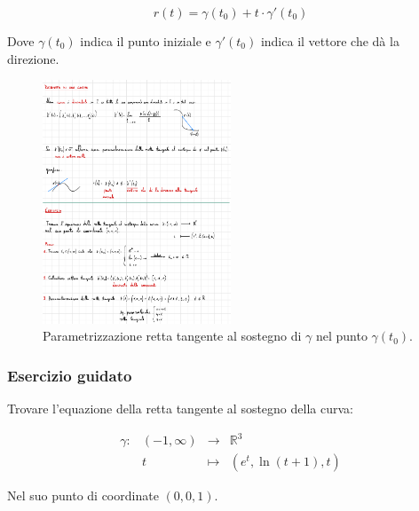 \documentclass[a4paper]{article}
\begin{document}
	\begin{equation*}
		r\left(t\right) = \gamma\left(t_{0}\right) + t \cdot \gamma'\left(t_{0}\right)
	\end{equation*}

	\noindent
	Dove $\gamma\left(t_{0}\right)$ indica il punto iniziale e $\gamma'\left(t_{0}\right)$ indica il vettore che dà la direzione.
	
	\begin{figure}[!htp]
		\centering
		\includegraphics[width=0.5\textwidth]{img/derivata_curva2.pdf}
		\caption{Parametrizzazione retta tangente al sostegno di $\gamma$ nel punto $\gamma\left(t_{0}\right)$.}
	\end{figure}

	\newpage
	
	\subsubsection[Esercizio guidato]{\textcolor{Green4}{Esercizio guidato}}
	
	Trovare l'equazione della retta tangente al sostegno della curva:
	
	\begin{equation*}
		\begin{array}{llll}
			\gamma:	& \left(-1,\infty\right) & \longrightarrow & \mathbb{R}^{3} \\
					& t						 & \longmapsto     & \left(e^{t}, \ln\left(t+1\right), t\right)
		\end{array}
	\end{equation*}

	\noindent
	Nel suo punto di coordinate $\left(0,0,1\right)$.\newline
	
\end{document}
